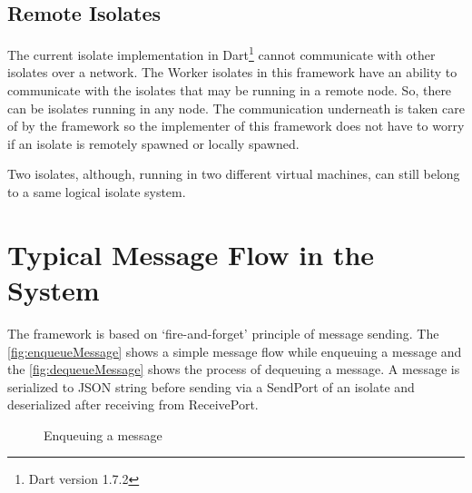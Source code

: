 \subsection{Remote Isolates}
\label{subsec:remoteIsolate}
  The current isolate implementation in Dart\footnote{Dart version 1.7.2} cannot communicate with other isolates over a network. The Worker isolates in this framework have an ability to communicate with the isolates that may be running in a remote node. So, there can be isolates running in any node. The communication underneath is taken care of by the framework so the implementer of this framework does not have to worry if an isolate is remotely spawned or locally spawned.

  Two isolates, although, running in two different virtual machines, can still belong to a same logical isolate system.

\section{Typical Message Flow in the System}
The framework is based on ‘fire-and-forget’ principle of message sending. The \autoref{fig:enqueueMessage} shows a simple message flow while enqueuing a message and the \autoref{fig:dequeueMessage} shows the process of dequeuing a message.
A message is serialized to JSON string before sending via a SendPort of an isolate and deserialized after receiving from ReceivePort.

\begin{figure}[H]
  \centering
  \tiny
\begin{sequencediagram}


\end{sequencediagram}
  \caption{Enqueuing a message}
  \label{fig:enqueueMessage}
\end{figure}
\normalsize


